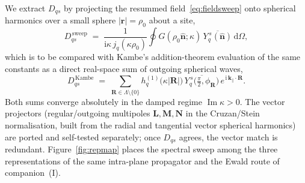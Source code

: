 \documentclass[11pt,a4paper]{article}
\newcommand{\rd}{\mathrm{d}}
\newcommand{\ii}{\mathrm{i}}
\newcommand{\Imm}{\operatorname{Im}}
\newcommand{\kpar}{\mathbf{k}_{\parallel}}
\newcommand{\vr}{\mathbf{r}}
\newcommand{\vR}{\mathbf{R}}
\newcommand{\Dqs}{D_{q s}}
\begin{document}
We extract $\Dqs$ by projecting the resummed field~\eqref{eq:fieldsweep} onto
spherical harmonics over a small sphere $\lvert\vr\rvert=\rho_0$ about a site,
\begin{equation}
  \Dqs^{\,\mathrm{sweep}}
  \;=\;\frac{1}{\ii\kappa\, j_q(\kappa\rho_0)}
        \oint G(\rho_0\hat{\mathbf{n}};\kappa)\,
        \overline{Y_q^{\,s}(\hat{\mathbf{n}})}\,\rd\Omega,
  \label{eq:project}
\end{equation}
which is to be compared with Kambe's addition-theorem evaluation of the same
constants as a direct real-space sum of outgoing spherical waves,
\begin{equation}
  \Dqs^{\,\mathrm{Kambe}}
  \;=\;\sum_{\vR\in\Lambda\setminus\{0\}}
        h_q^{(1)}\!\bigl(\kappa\lvert\vR\rvert\bigr)\,
        \overline{Y_q^{\,s}\!\bigl(\tfrac{\pi}{2},\phi_{\vR}\bigr)}\,
        e^{\,\ii\,\kpar\cdot\vR}.
  \label{eq:kambe}
\end{equation}
Both sums converge absolutely in the damped regime $\Imm\kappa>0$. The vector
projectors (regular/outgoing multipoles $\mathbf L,\mathbf M,\mathbf N$ in the
Cruzan/Stein normalisation, built from the radial and tangential vector
spherical harmonics) are ported and self-tested separately; once $\Dqs$ agrees,
the vector match is redundant. Figure~\ref{fig:repmap} places the spectral
sweep among the three representations of the same intra-plane propagator and
the Ewald route of companion~(I).
\end{document}
